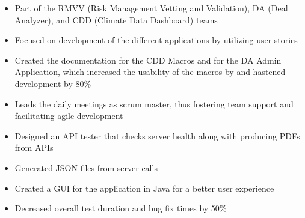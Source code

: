 \documentclass[10pt,a4paper,ragged2e,withhyper,darkmode]{altacv}
\begin{document}
\begin{paracol}{1}
  \begin{itemize}
    \item{Part of the RMVV (Risk Management Vetting and Validation), DA (Deal Analyzer), and CDD (Climate Data Dashboard) teams}
    \item{Focused on development of the different applications by utilizing user stories}
    \item{Created the documentation for the CDD Macros and for the DA Admin Application, which increased the usability of the macros by and hastened development by 80\%}
    \item{Leads the daily meetings as scrum master, thus fostering team support and facilitating agile development}
  \end{itemize}
  \begin{itemize}
    \item Designed an API tester that checks server health along with producing PDFs from APIs
    \item Generated JSON files from server calls
    \item Created a GUI for the application in Java for a better user experience
    \item Decreased overall test duration and bug fix times by 50\%
  \end{itemize}


\end{paracol}
\end{document}

